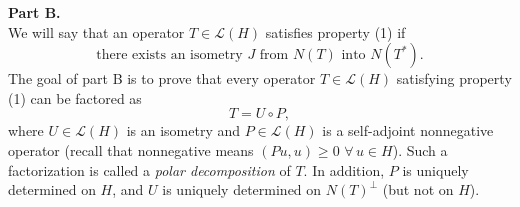 \documentclass[12pt]{article}
\begin{document}
\noindent\textbf{Part B.}\\
We will say that an operator $T \in \mathcal{L}(H)$ satisfies property (1) if
\begin{equation}\tag{1}
\text{there exists an isometry } J \text{ from } N(T) \text{ into } N(T^*).
\end{equation}
The goal of part B is to prove that every operator $T \in \mathcal{L}(H)$ satisfying property (1)
can be factored as
\[
T = U \circ P,
\]
where $U \in \mathcal{L}(H)$ is an isometry and $P \in \mathcal{L}(H)$ is a self-adjoint nonnegative
operator (recall that nonnegative means $(Pu,u) \ge 0$ $\forall\, u \in H$). Such a factorization
is called a \emph{polar decomposition} of $T$. In addition, $P$ is uniquely determined on $H$,
and $U$ is uniquely determined on $N(T)^\perp$ (but not on $H$).
 
\end{document}
